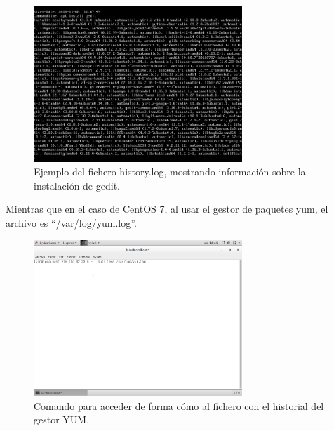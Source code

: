 \begin{figure}[H]
	\begin{center}
		\includegraphics[width=0.7\textwidth]{Imagenes/Instalacion_gedit_server}
		\caption{Ejemplo del fichero history.log, mostrando información sobre la instalación de gedit.} \label{fig:2}
	\end{center}
\end{figure}

Mientras que en el caso de CentOS 7, al usar el gestor de paquetes yum, el archivo es ``/var/log/yum.log''. \cite{RedHatAPTLOG}

\begin{figure}[H]
	\begin{center}
		\includegraphics[width=0.7\textwidth]{Imagenes/Comando_acceso_yum_log}
		\caption{Comando para acceder de forma cómo al fichero con el historial del gestor YUM.} \label{fig:3}
	\end{center}
\end{figure}


